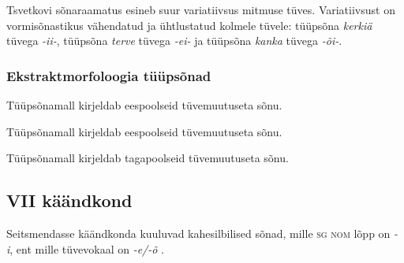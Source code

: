\documentclass[12pt,a4paper]{article}
\newcommand{\vadja}[1]{\textit{#1}}
\newcommand{\msd}[1]{\textsc{#1}}
\begin{document}
Tsvetkovi sõnaraamatus esineb suur variatiivsus mitmuse tüves. Variatiivsust on vormi\-sõnastikus vähendatud ja ühtlustatud kolmele tüvele: tüüp\-sõna \textit{kerkiä} tüvega \textit{-ii-}, tüüpsõna \textit{terve} tüvega \textit{-ei-} ja tüüpsõna \textit{kanka} tüvega \textit{-õi-}.


\subsubsection*{Ekstraktmorfoloogia tüüpsõnad}
\vspace{-3.5em}

Tüüpsõna\-mall kirjeldab eespoolseid tüvemuutuseta sõnu.

Tüüpsõna\-mall kirjeldab eespoolseid tüvemuutuseta sõnu.

Tüüpsõna\-mall kirjeldab tagapoolseid tüvemuutuseta sõnu.

\subsection{\RN{7} käändkond}

Seitsmendasse käändkonda kuuluvad kahesilbilised sõnad, mille \msd{sg nom} lõpp on \vadja{-i}, ent mille tüvevokaal on \vadja{-e/-õ} \cite[45]{ariste_grammar_1968}.

\end{document}
